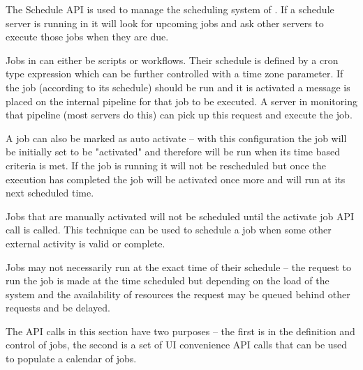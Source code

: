 The Schedule API is used to manage the scheduling system of \Rapture. If a schedule server is running
in \Rapture it will look for upcoming jobs and ask other \Rapture servers to execute those jobs when they are due.

Jobs in \Rapture can either be scripts or workflows. Their schedule is defined by a cron type expression which can
be further controlled with a time zone parameter. If the job (according to its schedule) should be run and it is
activated a message is placed on the internal \Rapture pipeline for that job to be executed. A server in \Rapture
monitoring that pipeline (most \Rapture servers do this) can pick up this request and execute the job.

A job can also be marked as auto activate -- with this configuration the job will be initially set to be "activated" and therefore
will be run when its time based criteria is met. If the job is running it will not be rescheduled but once the execution
has completed the job will be activated once more and will run at its next scheduled time.

Jobs that are manually activated will not be scheduled until the activate job API call is called. This technique can be used to
schedule a job when some other external activity is valid or complete.

Jobs may not necessarily run at the exact time of their schedule -- the request to run the job is made at the time
scheduled but depending on the load of the system and the availability of resources the request may be queued behind other requests
and be delayed.

The API calls in this section have two purposes -- the first is in the definition and control of jobs, the second is a set
of UI convenience API calls that can be used to populate a calendar of jobs.
